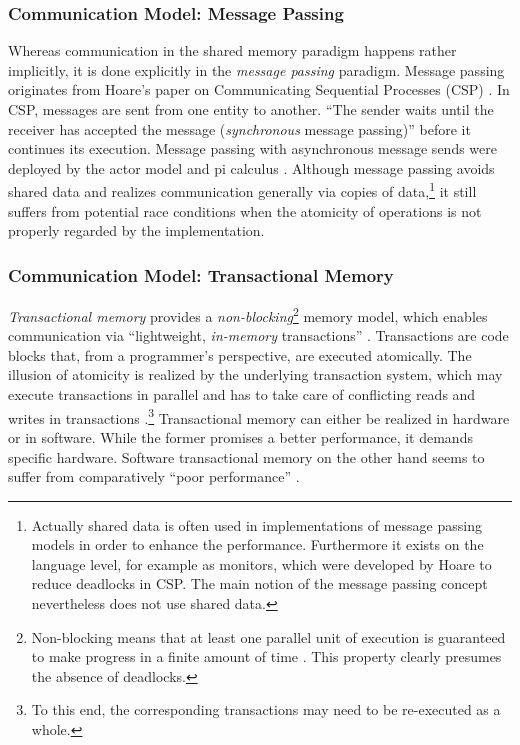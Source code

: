 \subsubsection{Communication Model: Message Passing}
Whereas communication in the shared memory paradigm happens rather implicitly, it is done explicitly in the \textit{message passing} paradigm. Message passing originates from Hoare's paper on Communicating Sequential Processes (CSP) \cite{CommunicatingSequentialProcesses}. In CSP, messages are sent from one entity to another. ``The sender waits until the receiver has accepted the message (\textit{synchronous} message passing)'' \cite[p.~138]{DistributedSharedMemory} before it continues its execution. Message passing with asynchronous message sends were deployed by the actor model \cite{UniversalModularACTORFormalism} and pi calculus \cite{ThePolyadicPi-Calculus}. Although message passing avoids shared data and realizes communication generally via copies of data,\footnote{Actually shared data is often used in implementations of message passing models in order to enhance the performance. Furthermore it exists on the language level, for example as monitors, which were developed by Hoare to reduce deadlocks in CSP. The main notion of the message passing concept nevertheless does not use shared data.} it still suffers from potential race conditions \cite{DebuggingRaceConditions} when the atomicity of operations is not properly regarded by the implementation.

\subsubsection{Communication Model: Transactional Memory}
\textit{Transactional memory} provides a \textit{non-blocking}\footnote{Non-blocking means that at least one parallel unit of execution is guaranteed to make progress in a finite amount of time \cite{NonBlockingSynchronization}. This property clearly presumes the absence of deadlocks.} memory model, which enables communication via ``lightweight, \textit{in-memory} transactions'' \cite[p.~3]{PrinciplesOfTransactionalMemory}. Transactions are code blocks that, from a programmer's perspective, are executed atomically. The illusion of atomicity is realized by the underlying transaction system, which may execute transactions in parallel and has to take care of conflicting reads and writes in transactions \cite{TransactionalMemory}.\footnote{To this end, the corresponding transactions may need to be re-executed as a whole.} Transactional memory can either be realized in hardware or in software. While the former promises a better performance, it demands specific hardware. Software transactional memory on the other hand seems to suffer from comparatively ``poor performance'' \cite[p.~13]{TransactionalProgrammabilityAndPerformance}.

